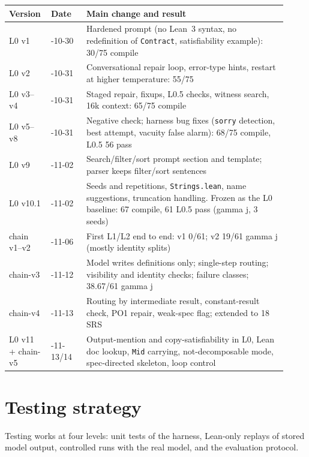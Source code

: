 \documentclass[11pt,a4paper]{article}
\newcommand{\code}[1]{\texttt{#1}}
\newcommand{\file}[1]{\texttt{#1}}
\begin{document}
\small
\begin{longtable}{>{\raggedright\arraybackslash}p{0.12\linewidth} >{\raggedright\arraybackslash}p{0.12\linewidth} >{\raggedright\arraybackslash}p{0.68\linewidth}}
\toprule
Version & Date & Main change and result \\
\midrule
\endhead
L0 v1 & 2026-10-30 & Hardened prompt (no Lean~3 syntax, no redefinition of \code{Contract}, satisfiability example): 30/75 compile \\
L0 v2 & 2026-10-31 & Conversational repair loop, error-type hints, restart at higher temperature: 55/75 \\
L0 v3--v4 & 2026-10-31 & Staged repair, fixups, L0.5 checks, witness search, 16k context: 65/75 compile \\
L0 v5--v8 & 2026-10-31 & Negative check; harness bug fixes (\code{sorry} detection, best attempt, vacuity false alarm): 68/75 compile, L0.5 56 pass \\
L0 v9 & 2026-11-02 & Search/filter/sort prompt section and template; parser keeps filter/sort sentences \\
L0 v10.1 & 2026-11-02 & Seeds and repetitions, \file{Strings.lean}, name suggestions, truncation handling. Frozen as the L0 baseline: 67 compile, 61 L0.5 pass (gamma j, 3 seeds) \\
chain v1--v2 & 2026-11-06 & First L1/L2 end to end: v1 0/61; v2 19/61 gamma j (mostly identity splits) \\
chain-v3 & 2026-11-12 & Model writes definitions only; single-step routing; visibility and identity checks; failure classes; 38.67/61 gamma j \\
chain-v4 & 2026-11-13 & Routing by intermediate result, constant-result check, PO1 repair, weak-spec flag; extended to 18 SRS \\
L0 v11 + chain-v5 & 2026-11-13/14 & Output-mention and copy-satisfiability in L0, Lean doc lookup, \code{Mid} carrying, not-decomposable mode, spec-directed skeleton, loop control \\
\bottomrule
\end{longtable}
\normalsize

\section{Testing strategy}

Testing works at four levels: unit tests of the harness, Lean-only replays of stored model
output, controlled runs with the real model, and the evaluation protocol.
\end{document}
